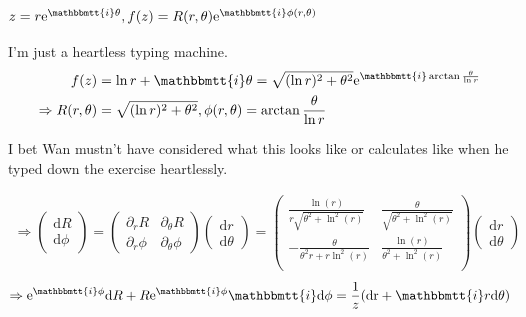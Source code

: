 \documentclass[]{ctexart}
\newcommand{\mi}{\mathbbmtt{i}}
\newcommand{\di}{\mathrm{d}}
\newcommand{\pa}{\partial}
\newcommand{\me}{\mathrm{e}}
\begin{document}
			\subsubsection{$z=r\me ^{\mi \theta},f(z)=R(r,\theta)\me ^{\mi \phi(r,\theta)}$}
			I'm just a heartless typing machine. 
				\begin{equation*}
				\begin{aligned}
					f(z)&=\ln r+\mi \theta=\sqrt{(\ln r)^2+\theta^2}\me ^{\mi \arctan\frac{\theta}{\ln r}}\\
					\Rightarrow R(r,\theta)&=\sqrt{(\ln r)^2+\theta^2},\phi(r,\theta)=\arctan\frac{\theta}{\ln r}
				\end{aligned}
				\end{equation*}
				
			I bet Wan mustn't have considered what this looks like or calculates like when he typed down the exercise heartlessly. 
			
				\begin{equation*}
				\begin{aligned}
				\Rightarrow
				\begin{pmatrix}
					\di R\\
					\di \phi
				\end{pmatrix}
				=
				\begin{pmatrix}
					\pa_rR & \pa_{\theta}R\\
					\pa_r\phi & \pa_{\theta}\phi
				\end{pmatrix}
				\begin{pmatrix}
					\di r\\
					\di \theta
				\end{pmatrix}
				=
				\left(
				\begin{array}{cc}
					\frac{\ln (r)}{r \sqrt{\theta ^2+\ln ^2(r)}} & \frac{\theta }{\sqrt{\theta ^2+\ln ^2(r)}} \\
					-\frac{\theta }{\theta ^2 r+r \ln ^2(r)} & \frac{\ln (r)}{\theta ^2+\ln ^2(r)} \\
				\end{array}
				\right)
				\begin{pmatrix}
					\di r\\
					\di \theta
				\end{pmatrix}
				\end{aligned}
				\end{equation*}
				\begin{equation*}
				\begin{aligned}
					\Rightarrow \me ^{\mi \phi }\di R+R\me ^{\mi \phi}\mi \di \phi=\frac{1}{z}(\text{dr}+\mi  r\text{d}\theta)
				\end{aligned}
				\end{equation*}
				
\end{document}
